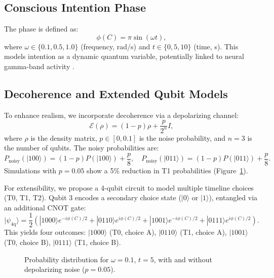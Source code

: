 \documentclass[a4paper,12pt]{article}
\begin{document}
\subsection{Conscious Intention Phase}
The phase is defined as:
\[
\phi(C) = \pi \sin(\omega t),
\]
where $\omega \in \{0.1, 0.5, 1.0\}$ (frequency, rad/s) and $t \in \{0, 5, 10\}$ (time, s). This models intention as a dynamic quantum variable, potentially linked to neural gamma-band activity \cite{lutz2004}.

\subsection{Decoherence and Extended Qubit Models}\label{sec:decoherence}
To enhance realism, we incorporate decoherence via a depolarizing channel:
\[
\mathcal{E}(\rho) = (1-p)\rho + \frac{p}{2^n} I,
\]
where $\rho$ is the density matrix, $p \in [0, 0.1]$ is the noise probability, and $n=3$ is the number of qubits. The noisy probabilities are:
\[
P_{\text{noisy}}(|100\rangle) = (1-p)P(|100\rangle) + \frac{p}{8}, \quad P_{\text{noisy}}(|011\rangle) = (1-p)P(|011\rangle) + \frac{p}{8}.
\]
Simulations with $p=0.05$ show a 5\% reduction in T1 probabilities (Figure~\ref{fig:decoherence}).

For extensibility, we propose a 4-qubit circuit to model multiple timeline choices (T0, T1, T2). Qubit 3 encodes a secondary choice state ($|0\rangle$ or $|1\rangle$), entangled via an additional CNOT gate:
\[
|\psi_{\text{4q}}\rangle = \frac{1}{2} \left( |1000\rangle e^{-i\phi(C)/2} + |0110\rangle e^{i\phi(C)/2} + |1001\rangle e^{-i\phi(C)/2} + |0111\rangle e^{i\phi(C)/2} \right).
\]
This yields four outcomes: $|1000\rangle$ (T0, choice A), $|0110\rangle$ (T1, choice A), $|1001\rangle$ (T0, choice B), $|0111\rangle$ (T1, choice B).

\begin{figure}[h]
\centering
{}
\caption{Probability distribution for $\omega = 0.1$, $t = 5$, with and without depolarizing noise ($p=0.05$).}
\label{fig:decoherence}
\end{figure}
\end{document}
